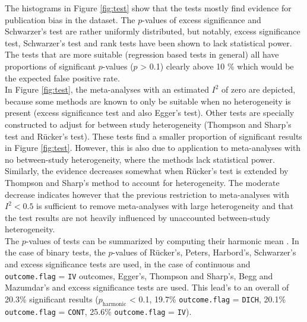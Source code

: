 \documentclass[11pt,a4paper,twoside]{book}\usepackage[]{graphicx}\usepackage[]{color}
\begin{document}
The histograms in Figure \ref{fig:test} show that the tests mostly find evidence for publication bias in the dataset. The $p$-values of excess significance and Schwarzer's test are rather uniformly distributed, but notably, excess significance test, Schwarzer's test and rank tests have been shown to lack statistical power. The tests that are more suitable (regression based tests in general) all have proportions of significant $p$-values ($p$ > 0.1) clearly above 10 \% which would be the expected false positive rate.\\
In Figure \ref{fig:test}, the meta-analyses with an estimated $I^2$ of zero are depicted, because some methods are known to only be suitable when no heterogeneity is present (excess significance test and also Egger's test). Other tests are specially constructed to adjust for between study heterogeneity (Thompson and Sharp's test and R\"ucker's test). These tests find a smaller proportion of significant results in Figure \ref{fig:test}. However, this is also due to application to meta-analyses with no between-study heterogeneity, where the methods lack statistical power. Similarly, the evidence decreases somewhat when R\"ucker's test is extended by Thompson and Sharp's method to account for heterogeneity. The moderate decrease indicates however that the previous restriction to meta-analyses with $I^2 < 0.5$ is sufficient to remove meta-analyses with large heterogeneity and that the test results are not heavily influenced by unaccounted between-study heterogeneity.\\
The $p$-values of tests can be summarized by computing their harmonic mean \citep{harmonic.p}. In the case of binary tests, the $p$-values of R\"ucker's, Peters, Harbord's, Schwarzer's and excess significance tests are used, in the case of continuous and \texttt{outcome.flag} = \texttt{IV} outcomes, Egger's, Thompson and Sharp's, Begg and Mazumdar's and excess significance tests are used. This lead's to an overall of 20.3\% significant results ($p_\textrm{harmonic}$ < 0.1, 19.7\% \texttt{outcome.flag} = \texttt{DICH}, 20.1\% \texttt{outcome.flag} = \texttt{CONT}, 25.6\% \texttt{outcome.flag} = \texttt{IV}).
\end{document}
